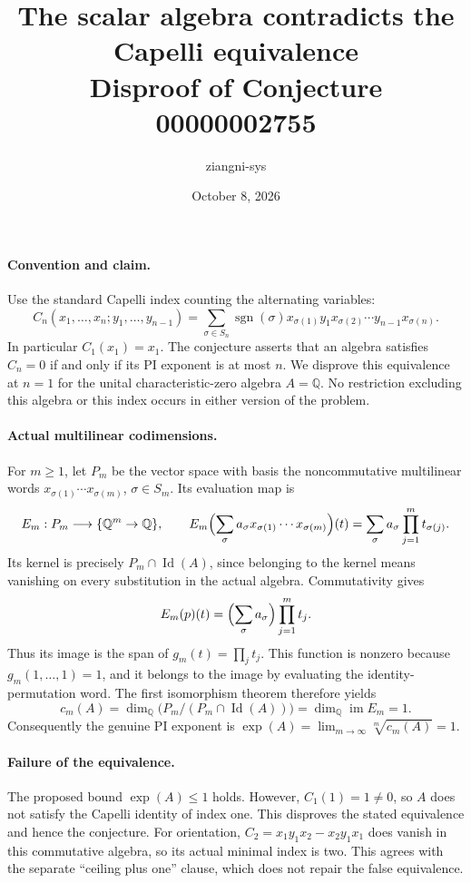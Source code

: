 \documentclass[11pt]{article}
\title{The scalar algebra contradicts the Capelli equivalence\\Disproof of Conjecture 00000002755}
\author{ziangni-sys}
\date{October 8, 2026}
\begin{document}
\maketitle
\paragraph{Convention and claim.}
Use the standard Capelli index counting the alternating variables:
\[
 C_n(x_1,\ldots,x_n;y_1,\ldots,y_{n-1})
 =\sum_{\sigma\in S_n}\operatorname{sgn}(\sigma)
 x_{\sigma(1)}y_1x_{\sigma(2)}\cdots y_{n-1}x_{\sigma(n)}.
\]
In particular $C_1(x_1)=x_1$. The conjecture asserts that an algebra
satisfies $C_n=0$ if and only if its PI exponent is at most $n$.
We disprove this equivalence at $n=1$ for the unital characteristic-zero
algebra $A=\mathbb Q$. No restriction excluding this algebra or this
index occurs in either version of the problem.

\paragraph{Actual multilinear codimensions.}
For $m\geq1$, let $P_m$ be the vector space with basis the noncommutative
multilinear words $x_{\sigma(1)}\cdots x_{\sigma(m)}$, $\sigma\in S_m$.
Its evaluation map is
\[
 E_m:P_m\longrightarrow \{\mathbb Q^m\to\mathbb Q\},\qquad
 E_m\Bigl(\sum_\sigma a_\sigma x_{\sigma(1)}\cdots x_{\sigma(m)}\Bigr)(t)
 =\sum_\sigma a_\sigma\prod_{j=1}^m t_{\sigma(j)}.
\]
Its kernel is precisely $P_m\cap\operatorname{Id}(A)$, since belonging
to the kernel means vanishing on every substitution in the actual algebra.
Commutativity gives
\[
 E_m(p)(t)=\Bigl(\sum_\sigma a_\sigma\Bigr)\prod_{j=1}^m t_j.
\]
Thus its image is the span of $g_m(t)=\prod_j t_j$. This function is
nonzero because $g_m(1,\ldots,1)=1$, and it belongs to the image by
evaluating the identity-permutation word. The first isomorphism theorem
therefore yields
\[
 c_m(A)=\dim_{\mathbb Q}\bigl(P_m/(P_m\cap\operatorname{Id}(A))\bigr)
       =\dim_{\mathbb Q}\operatorname{im}E_m=1.
\]
Consequently the genuine PI exponent is
$\operatorname{exp}(A)=\lim_{m\to\infty}\sqrt[m]{c_m(A)}=1$.

\paragraph{Failure of the equivalence.}
The proposed bound $\operatorname{exp}(A)\leq1$ holds. However,
$C_1(1)=1\ne0$, so $A$ does not satisfy the Capelli identity of index
one. This disproves the stated equivalence and hence the conjecture.
For orientation, $C_2=x_1y_1x_2-x_2y_1x_1$ does vanish in this
commutative algebra, so its actual minimal index is two. This agrees
with the separate ``ceiling plus one'' clause, which does not repair
the false equivalence.
\end{document}
